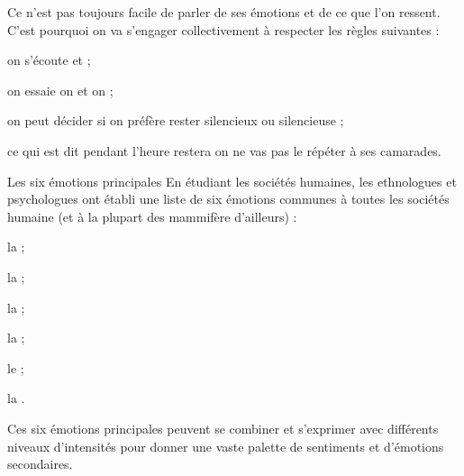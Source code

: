 \strut \vspace*{-40pt}


\begin{contexte}
  Ce n'est pas toujours facile de parler de ses émotions et de ce que l'on ressent.
  C'est pourquoi on va s'engager collectivement à respecter les règles suivantes :
  \begin{listePoints}
    \item on s'écoute et  ;
    \item on essaie  on  et on  ;
    \item on peut décider  si on préfère rester silencieux ou silencieuse ;
    \item ce qui est dit pendant l'heure restera  on ne vas pas le répéter à ses camarades.
  \end{listePoints}
\end{contexte}



\begin{doc}{Les six émotions principales}
  En étudiant les sociétés humaines, les ethnologues et psychologues ont établi une liste de six émotions communes à toutes les sociétés humaine (et à la plupart des mammifère d'ailleurs) :
  \begin{listePoints}[2]
    \item la  ;
    \item la  ;
    \item la  ;
    \item la  ;
    \item le  ;
    \item la .
  \end{listePoints}

  Ces six émotions principales peuvent se combiner et s'exprimer avec différents niveaux d'intensités pour donner une vaste palette de sentiments et d'émotions secondaires.
\end{doc}

